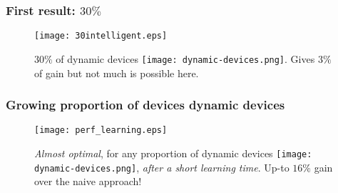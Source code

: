 \subsubsection{First result: $30\%$}

\begin{frameO}

    \begin{figure}[h!]
        \centering
        \texttt{[image: 30intelligent.eps]}

            \begin{small}
                $30\%$ of dynamic devices \texttt{[image: dynamic-devices.png]}. Gives $3\%$ of gain but not much is possible here.
            \end{small}
    \end{figure}

\end{frameO}


\subsubsection{Growing proportion of devices dynamic devices}

\begin{frameO}[Dependency on \(D/(S+D)\)]

    \begin{figure}[h!]
        \centering
        \texttt{[image: perf\_learning.eps]}

            \emph{Almost optimal}, for any proportion of dynamic devices \texttt{[image: dynamic-devices.png]}, \emph{after a short learning time}. Up-to $16\%$ gain over the naive approach!
    \end{figure}

\end{frameO}


